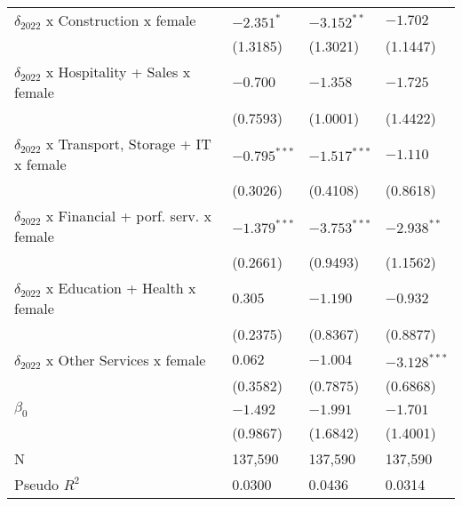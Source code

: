 \begin{tabular}{llll}
$\delta_{2022}$ x Construction x female            &         $-2.351^*$ &      $-3.152^{**}$ &           $-1.702$ \\
                                                   &           (1.3185) &           (1.3021) &           (1.1447) \\
$\delta_{2022}$ x Hospitality + Sales x female     &           $-0.700$ &           $-1.358$ &           $-1.725$ \\
                                                   &           (0.7593) &           (1.0001) &           (1.4422) \\
$\delta_{2022}$ x Transport, Storage + IT x female &     $-0.795^{***}$ &     $-1.517^{***}$ &           $-1.110$ \\
                                                   &           (0.3026) &           (0.4108) &           (0.8618) \\
$\delta_{2022}$ x Financial + porf. serv. x female &     $-1.379^{***}$ &     $-3.753^{***}$ &      $-2.938^{**}$ \\
                                                   &           (0.2661) &           (0.9493) &           (1.1562) \\
$\delta_{2022}$ x Education + Health x female      &            $0.305$ &           $-1.190$ &           $-0.932$ \\
                                                   &           (0.2375) &           (0.8367) &           (0.8877) \\
$\delta_{2022}$ x Other Services x female          &            $0.062$ &           $-1.004$ &     $-3.128^{***}$ \\
                                                   &           (0.3582) &           (0.7875) &           (0.6868) \\
$\beta_0$                                          &           $-1.492$ &           $-1.991$ &           $-1.701$ \\
                                                   &           (0.9867) &           (1.6842) &           (1.4001) \\
N                                                  &            137,590 &            137,590 &            137,590 \\
Pseudo $R^2$                                       &             0.0300 &             0.0436 &             0.0314 \\
\bottomrule
\end{tabular}
